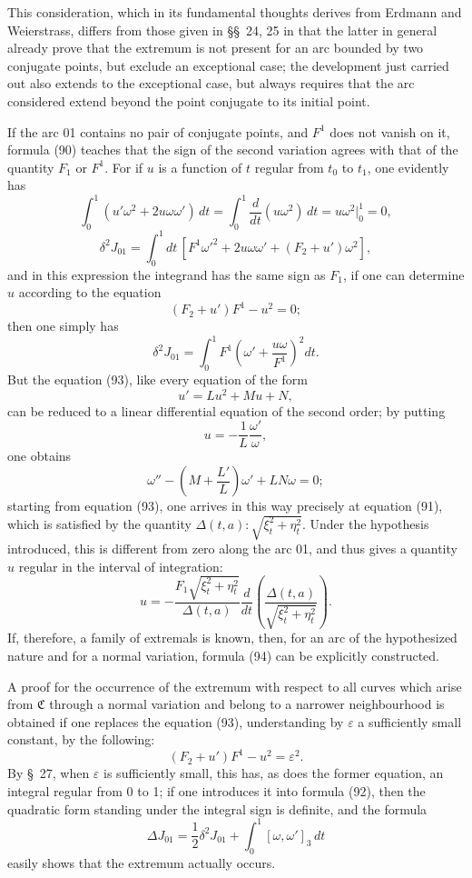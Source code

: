 \documentclass[11pt,a4paper,leqno]{article}
\begin{document}
This consideration, which in its fundamental thoughts derives from Erdmann and Weierstrass, differs from those given in \S\S~24, 25 in that the latter in general already prove that the extremum is not present for an arc bounded by two conjugate points, but exclude an exceptional case; the development just carried out also extends to the exceptional case, but always requires that the arc considered extend beyond the point conjugate to its initial point.

If the arc 01 contains no pair of conjugate points, and $F^1$ does not vanish on it, formula (90) teaches that the sign of the second variation agrees with that of the quantity $F_1$ or $F^1$. For if $u$ is a function of $t$ regular from $t_0$ to $t_1$, one evidently has
\[
\int_0^1(u'\omega^2+2u\omega\omega')\,dt
=\int_0^1\frac{d}{dt}(u\omega^2)\,dt
=u\omega^2\bigg|_0^1=0,
\]
\begin{equation}\tag{92}
\delta^2J_{01}=\int_0^1dt\,[F^1\omega'^2+2u\omega\omega'+(F_2+u')\omega^2],
\end{equation}
and in this expression the integrand has the same sign as $F_1$, if one can determine $u$ according to the equation
\begin{equation}\tag{93}
(F_2+u')F^1-u^2=0;
\end{equation}
then one simply has
\begin{equation}\tag{94}
\delta^2J_{01}=\int_0^1F^1\left(\omega'+\frac{u\omega}{F^1}\right)^2dt.
\end{equation}
But the equation (93), like every equation of the form
\[
u'=Lu^2+Mu+N,
\]
can be reduced to a linear differential equation of the second order; by putting
\[
u=-\frac1L\frac{\omega'}{\omega},
\]
one obtains
\[
\omega''-\left(M+\frac{L'}L\right)\omega'+LN\omega=0;
\]
starting from equation (93), one arrives in this way precisely at equation (91), which is satisfied by the quantity $\Delta(t,a):\sqrt{\xi_t^2+\eta_t^2}$. Under the hypothesis introduced, this is different from zero along the arc 01, and thus gives a quantity $u$ regular in the interval of integration:
\[
u=-\frac{F_1\sqrt{\xi_t^2+\eta_t^2}}{\Delta(t,a)}\frac{d}{dt}\left(\frac{\Delta(t,a)}{\sqrt{\xi_t^2+\eta_t^2}}\right).
\]
If, therefore, a family of extremals is known, then, for an arc of the hypothesized nature and for a normal variation, formula (94) can be explicitly constructed.

A proof for the occurrence of the extremum with respect to all curves which arise from $\mathfrak C$ through a normal variation and belong to a narrower neighbourhood is obtained if one replaces the equation (93), understanding by $\varepsilon$ a sufficiently small constant, by the following:
\[
(F_2+u')F^1-u^2=\varepsilon^2.
\]
By \S~27, when $\varepsilon$ is sufficiently small, this has, as does the former equation, an integral regular from 0 to 1; if one introduces it into formula (92), then the quadratic form standing under the integral sign is definite, and the formula
\[
\Delta J_{01}=\frac12\delta^2J_{01}+\int_0^1[\omega,\omega']_3\,dt
\]
easily shows that the extremum actually occurs.
\end{document}
